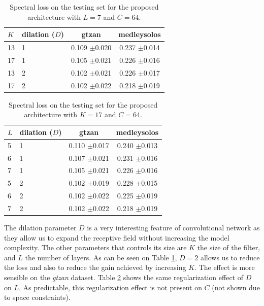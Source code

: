 \documentclass{article}
\begin{document}
\begin{table}[t]
  \begin{center}
\begin{tabular}{llcc}
$K$ & dilation ($D$) & gtzan & medleysolos \\
\hline
13 & 1 & 0.109 $\pm$0.020 & 0.237 $\pm$0.014 \\
17 & 1 & 0.105 $\pm$0.021 & 0.226 $\pm$0.016 \\
13 & 2 & 0.102 $\pm$0.021 & 0.226 $\pm$0.017 \\
17 & 2 & 0.102 $\pm$0.022 & 0.218 $\pm$0.019 \\
\end{tabular}
\caption{Spectral loss on the testing set for the proposed architecture with $L=7$ and $C=64$.}
\label{tab:kvsd}
  \end{center}
  \vspace{-4mm}
\end{table}

\begin{table}[t]
  \begin{center}
\begin{tabular}{llcc}
$L$ & dilation ($D$) & gtzan & medleysolos \\
\hline
5 & 1 & 0.110 $\pm$0.017 & 0.240 $\pm$0.013 \\
6 & 1 & 0.107 $\pm$0.021 & 0.231 $\pm$0.016 \\
7 & 1 & 0.105 $\pm$0.021 & 0.226 $\pm$0.016 \\
5 & 2 & 0.102 $\pm$0.019 & 0.228 $\pm$0.015 \\
6 & 2 & 0.102 $\pm$0.022 & 0.225 $\pm$0.019 \\
7 & 2 & 0.102 $\pm$0.022 & 0.218 $\pm$0.019 \\
\end{tabular}
\caption{Spectral loss on the testing set for the proposed architecture with $K=17$ and $C=64$.}
\label{tab:lvsd}
\end{center}
\vspace{-4mm}
\end{table}

The dilation parameter $D$ is a very interesting feature of convolutional network as they allow us to expand the receptive field without increasing the model complexity. The other parameters that controls its size are $K$ the size of the filter, and $L$ the number of layers. As can be seen on Table \ref{tab:kvsd}, $D=2$ allows us to reduce the loss and also to reduce the gain achieved by increasing $K$. The effect is more sensible on the \textit{gtzan} dataset. Table \ref{tab:lvsd} shows the same regularization effect of $D$ on $L$. As predictable, this regularization effect is not present on $C$ (not shown due to space constraints). %
\end{document}

